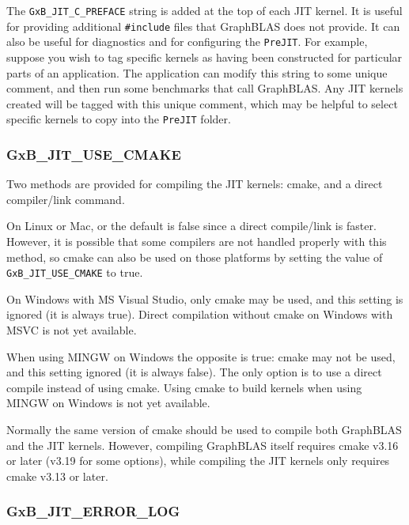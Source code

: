 \documentclass[12pt]{article}
\begin{document}
The \verb'GxB_JIT_C_PREFACE' string is added at the top of each JIT kernel.  It
is useful for providing additional \verb'#include' files that GraphBLAS does
not provide.  It can also be useful for diagnostics and for configuring the
\verb'PreJIT'.  For example, suppose you wish to tag specific kernels as having
been constructed for particular parts of an application.  The application can
modify this string to some unique comment, and then run some benchmarks that
call GraphBLAS.  Any JIT kernels created will be tagged with this unique
comment, which may be helpful to select specific kernels to copy into the
\verb'PreJIT' folder.

\subsubsection{\sf GxB\_JIT\_USE\_CMAKE}
\label{use_cmake}

Two methods are provided for compiling the JIT kernels: cmake, and a direct
compiler/link command.

On Linux or Mac, or the default is false since a direct compile/link is faster.
However, it is possible that some compilers are not handled properly with this
method, so cmake can also be used on those platforms by setting the value of
\verb'GxB_JIT_USE_CMAKE' to true.

On Windows with MS Visual Studio, only cmake may be used, and this setting is
ignored (it is always true).  Direct compilation without cmake on Windows with
MSVC is not yet available.

When using MINGW on Windows the opposite is true: cmake may not be used, and
this setting ignored (it is always false).  The only option is to use a direct
compile instead of using cmake.  Using cmake to build kernels when using MINGW
on Windows is not yet available.

Normally the same version of cmake should be used to compile both GraphBLAS and
the JIT kernels.  However, compiling GraphBLAS itself requires cmake v3.16 or
later (v3.19 for some options), while compiling the JIT kernels only requires
cmake v3.13 or later.

\subsubsection{\sf GxB\_JIT\_ERROR\_LOG}
\end{document}
